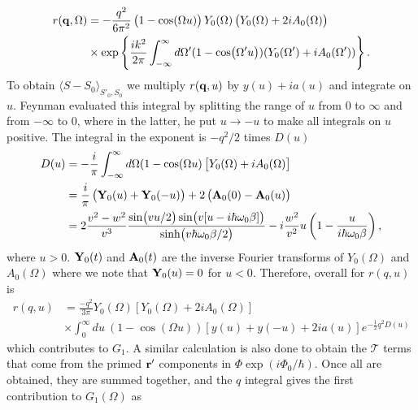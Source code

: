 \begin{equation}
    \begin{aligned}
        r(\vb{q}, \Omega) &= -\frac{q^2}{6\pi^2} \left(1 - \cos(\Omega u) \right) Y_0(\Omega) \left( Y_0(\Omega) + 2i A_0(\Omega) \right) \\
        &\times \exp\left\{ \frac{ik^2}{2\pi} \int^\infty_{-\infty} d\Omega' (1 - \cos(\Omega' u)) (Y_0(\Omega') + i A_0(\Omega')) \right\}.
    \end{aligned}
\end{equation}
To obtain $\langle S - S_0 \rangle_{S'_0, S_0}$ we multiply $r(\vb{q}, u)$ by $y(u) + ia(u)$ and integrate on $u$. Feynman evaluated this integral by splitting the range of $u$ from $0$ to $\infty$ and from $-\infty$ to $0$, where in the latter, he put $u \to -u$ to make all integrals on $u$ positive. The integral in the exponent is $-q^2 / 2$ times $D(u)$
\begin{equation}\label{eqn:D_FHIP}
    \begin{aligned}
        D(u) &= -\frac{i}{\pi} \int^\infty_{-\infty} d\Omega (1 - \cos(\Omega u) \left[ Y_0(\Omega) + iA_0(\Omega) \right] \\
        &= \frac{i}{\pi} \left( \vb{Y}_0(u) + \vb{Y}_0(-u) \right) + 2 \left( \vb{A}_0(0) - \vb{A}_0(u) \right) \\
        &= 2 \frac{v^2-w^2}{v^3} \frac{\sin(vu/2) \sin(v[u-i\hbar\omega_0\beta])}{\sinh(v\hbar\omega_0\beta/2)}-i\frac{w^2}{v^2}u\left(1-\frac{u}{i\hbar\omega_0\beta}\right),
    \end{aligned}
\end{equation}
where $u > 0$. $\vb{Y}_0(t)$ and $\vb{A}_0(t)$ are the inverse Fourier transforms of $Y_0(\Omega)$ and $A_0(\Omega)$ where we note that $\vb{Y}_0(u) = 0$ for $u < 0$. Therefore, overall for $r(q, u)$ is 
\begin{equation}
    \begin{aligned}
        r(q, u) &= \frac{-q^2}{3\pi} Y_0(\Omega) \left[ Y_0(\Omega) + 2i A_0(\Omega) \right] \\
        &\times \int^\infty_0 du\ (1 - \cos(\Omega u)) \left[ y(u) + y(-u) + 2ia(u) \right] e^{-\frac{1}{2}q^2D(u)}
    \end{aligned}
\end{equation}
which contributes to $G_1$. A similar calculation is also done to obtain the $\mathcal{T}$ terms that come from the primed $\vb{r}'$ components in $\Phi \exp(i \Phi_0 / \hbar)$. Once all are obtained, they are summed together, and the $q$ integral gives the first contribution to $G_1(\Omega)$ as
